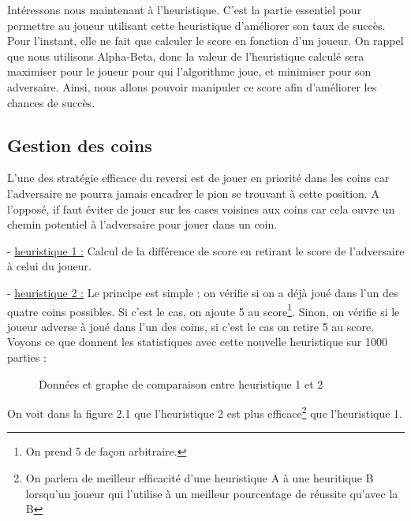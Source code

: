 \documentclass{report}
\begin{document}
Intéressons nous maintenant à l'heuristique. C'est la partie essentiel pour permettre au joueur utilisant cette heuristique d'améliorer son taux de succès. Pour l'instant, elle ne fait que calculer le score en fonction d'un joueur. On rappel que nous utilisons Alpha-Beta, donc la valeur de l'heuristique calculé sera maximiser pour le joueur pour qui l'algorithme joue, et minimiser pour son adversaire. Ainsi, nous allons pouvoir manipuler ce score afin d'améliorer les chances de succès.

\subsection{Gestion des coins}
L'une des stratégie efficace du reversi est de jouer en priorité dans les coins car l'adversaire ne pourra jamais encadrer le pion se trouvant à cette position. A l'opposé, if faut éviter de jouer sur les cases voisines aux coins car cela ouvre un chemin potentiel à l'adversaire pour jouer dans un coin.
\newline

- \underline{heuristique 1 :} Calcul de la différence de score en retirant le score de l'adversaire à celui du joueur.\newline

- \underline{heuristique 2 :}
Le principe est simple : on vérifie si on a déjà joué dans l'un des quatre coins possibles. Si c'est le cas, on ajoute 5 au score\footnote{On prend 5 de façon arbitraire.}. Sinon, on vérifie si le joueur adverse à joué dans l'un des coins, si c'est le cas on retire 5 au score.
\newline
\newline
Voyons ce que donnent les statistiques avec cette nouvelle heuristique sur 1000 parties :
\begin{figure}[!h]
\begin{center}
\caption{Données et graphe de comparaison entre heuristique 1 et 2}
\end{center}

\end{figure}
On voit dans la figure 2.1 que l'heuristique 2 est plus efficace\footnote{On parlera de meilleur efficacité d'une heuristique A à une heuritique B lorsqu'un  joueur qui l'utilise à un meilleur pourcentage de réussite qu'avec la B}  que l'heuristique 1.\newline
\end{document}
